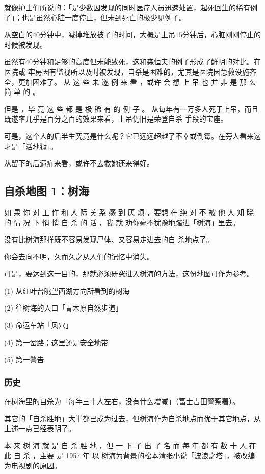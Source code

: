 \documentclass[UTF8]{ctexart}
\begin{document}
就像护士们所说的：「是少数因发现的同时医疗人员迅速处置，起死回生的稀有例子」；也是虽然心脏一度停止，但未到死亡的极少见例子。

从空白的$40$分钟中，减掉堆放被子的时间，大概是上吊$15$分钟后，心脏刚刚停止的时候被发现。

虽然有$40$分钟和足够的高度但未能致死，这和森恒夫的例子形成了鲜明的对比。在医院或 牢房因有监视所以及时被发现，自杀是困难的，尤其是医院因急救设施齐全，更加困难了。 从 这 些 未 遂 例 来 看 ，或许 会 想 上 吊 也 并 非 是 那 么 简 单 的 。

但是 ，毕 竟 这 些 都 是 极 稀 有 的 例 子 。 从每年有一万多人死于上吊，而且既遂率几乎是百分之百的效果来看，上吊仍旧是荣登自杀 手段的宝座。

可是，这个人的后半生究竟是什么呢？它已远远超越了不幸或倒霉。在旁人看来这才是「活地狱」。

从留下的后遗症来看，或许不去救她还来得好。

\subsection{自杀地图 1：树海}

如 果 你 对 工 作 和 人 际 关 系 感 到 厌 烦 ，要想 在 绝 对 不 被 他 人 知 晓 的 情 况 下 悄 悄 自 杀 的 话 ，我 就 劝你毫不犹豫地踏进「树海」里去。

没有比树海那样既不容易发现尸体、又容易走进去的自 杀地点了。 

你会去向不明，久而久之从人们的记忆中消失。

可是，要达到这一目的，那就必须研究进入树海的方法，这份地图可作为参考。

(1) 从红叶台眺望西湖方向所看到的树海

(2) 往树海的入口「青木原自然步道」

(3) 命运车站「风穴」

(4) 第一岔路；这里还是安全地带

(5) 第一警告

\subsubsection{历史}

在树海里的自杀为「每年三十人左右，没有什么增减」（富士吉田警察署）。

其它的「自杀胜地」大半都已成为过去，但树海作为自杀地点而优于其它地点，从上述一点已经表明了。

本 来 树 海 就 是 自 杀 胜 地 ，但 一 下 子 出 了 名 而 每 年 都 有 数 十 人 在 此 自 杀 ，主要 是 1957 年 以 树海为背景的松本清张小说「波浪之塔」，被改编为电视剧的原因。
\end{document}

